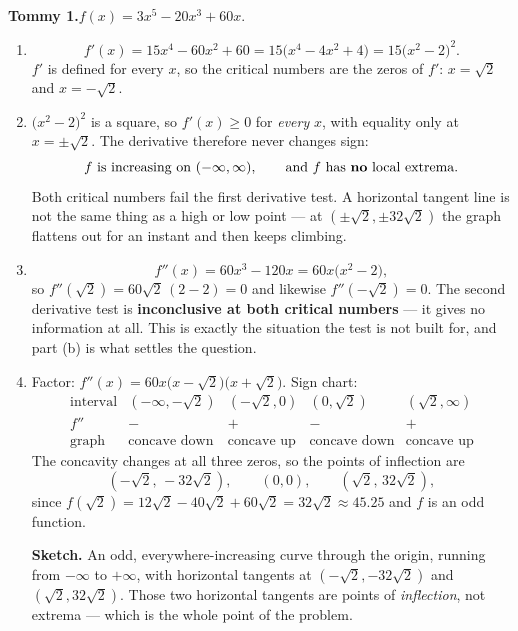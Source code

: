 \documentclass[11pt]{article}
\begin{document}
\bigskip
\noindent\textbf{Tommy 1.}\quad $f(x)=3x^{5}-20x^{3}+60x$.
\begin{enumerate}[label=\textbf{(\alph*)},leftmargin=2.8em,itemsep=8pt,topsep=5pt]
  \item
  \[
    f'(x)=15x^{4}-60x^{2}+60=15\bigl(x^{4}-4x^{2}+4\bigr)=15\bigl(x^{2}-2\bigr)^{2}.
  \]
  $f'$ is defined for every $x$, so the critical numbers are the zeros of $f'$:
  $x=\sqrt2$ and $x=-\sqrt2$.

  \item $\bigl(x^{2}-2\bigr)^{2}$ is a square, so $f'(x)\ge0$ for \emph{every} $x$, with
  equality only at $x=\pm\sqrt2$. The derivative therefore never changes sign:
  \[
    f\ \text{is increasing on}\ (-\infty,\infty),\qquad\text{and $f$ has \textbf{no} local
    extrema.}
  \]
  Both critical numbers fail the first derivative test. A horizontal tangent line is not
  the same thing as a high or low point --- at $\left(\pm\sqrt2,\pm32\sqrt2\right)$ the
  graph flattens out for an instant and then keeps climbing.

  \item
  \[
    f''(x)=60x^{3}-120x=60x\bigl(x^{2}-2\bigr),
  \]
  so $f''\!\left(\sqrt2\right)=60\sqrt2\,(2-2)=0$ and likewise
  $f''\!\left(-\sqrt2\right)=0$. The second derivative test is \textbf{inconclusive at
  both critical numbers} --- it gives no information at all. This is exactly the situation
  the test is not built for, and part (b) is what settles the question.

  \item Factor: $f''(x)=60x\bigl(x-\sqrt2\bigr)\bigl(x+\sqrt2\bigr)$. Sign chart:
  \[
    \begin{array}{c|cccc}
      \text{interval} & \left(-\infty,-\sqrt2\right) & \left(-\sqrt2,0\right)
        & \left(0,\sqrt2\right) & \left(\sqrt2,\infty\right)\\\hline
      f'' & - & + & - & +\\
      \text{graph} & \text{concave down} & \text{concave up} & \text{concave down}
        & \text{concave up}
    \end{array}
  \]
  The concavity changes at all three zeros, so the points of inflection are
  \[
    \left(-\sqrt2,\,-32\sqrt2\right),\qquad(0,0),\qquad\left(\sqrt2,\,32\sqrt2\right),
  \]
  since $f\!\left(\sqrt2\right)=12\sqrt2-40\sqrt2+60\sqrt2=32\sqrt2\approx45.25$ and $f$ is
  an odd function.

  \medskip
  \textbf{Sketch.} An odd, everywhere-increasing curve through the origin, running from
  $-\infty$ to $+\infty$, with horizontal tangents at $\left(-\sqrt2,-32\sqrt2\right)$ and
  $\left(\sqrt2,32\sqrt2\right)$. Those two horizontal tangents are points of
  \emph{inflection}, not extrema --- which is the whole point of the problem.
\end{enumerate}
\end{document}
